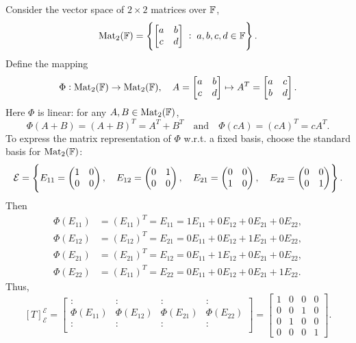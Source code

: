 \documentclass[11pt,openany]{article}
\begin{document}
\newpage
\begin{example*}
	Consider the vector space of \(2 \times 2\) matrices over \(\mathbb{F}\),
	\[
	\operatorname{Mat}_2(\mathbb{F}) = \left\{ \begin{bmatrix} a & b \\ c & d \end{bmatrix} \;:\; a,b,c,d \in \mathbb{F} \right\}.
	\]
	Define the mapping
	\[
	\Phi: \operatorname{Mat}_2(\mathbb{F}) \to \operatorname{Mat}_2(\mathbb{F}), \quad A=\begin{bmatrix} a & b \\ c & d \end{bmatrix} \mapsto A^T=\begin{bmatrix} a & c \\ b & d \end{bmatrix}.
	\] Here $\Phi$ is linear: for any $A,B\in\text{Mat}_2(\mathbb{F})$,
	\[
	\Phi(A+B) = (A+B)^T = A^T+B^T \quad\text{and}\quad \Phi(cA) = (cA)^T = cA^T.
	\]
	To express the matrix representation of \(\Phi\) w.r.t. a fixed basis, choose the standard basis for \(\operatorname{Mat}_2(\mathbb{F})\):
	\[\mathcal{E}=\set{
		E_{11}=\begin{pmatrix}1&0\\0&0\end{pmatrix},\quad
		E_{12}=\begin{pmatrix}0&1\\0&0\end{pmatrix},\quad
		E_{21}=\begin{pmatrix}0&0\\1&0\end{pmatrix},\quad
		E_{22}=\begin{pmatrix}0&0\\0&1\end{pmatrix}}.
	\] Then \begin{align*}
		\Phi(E_{11})&=(E_{11})^T=E_{11}=1E_{11}+0E_{12}+0E_{21}+0E_{22},\\
		\Phi(E_{12})&=(E_{12})^T=E_{21}=0E_{11}+0E_{12}+1E_{21}+0E_{22},\\
		\Phi(E_{21})&=(E_{21})^T=E_{12}=0E_{11}+1E_{12}+0E_{21}+0E_{22},\\
		\Phi(E_{22})&=(E_{11})^T=E_{22}=0E_{11}+0E_{12}+0E_{21}+1E_{22}.
	\end{align*} Thus, \[
	[T]_{\mathcal{E}}^{\mathcal{E}}=\begin{bmatrix}
		: & : & : & : \\
		\Phi(E_{11}) & \Phi(E_{12}) & \Phi(E_{21}) & \Phi(E_{22}) \\
		: & : & : & : \\
	\end{bmatrix}=\begin{bmatrix}
		1 & 0 & 0 & 0 \\
		0 & 0 & 1 & 0 \\
		0 & 1 & 0 & 0 \\
		0 & 0 & 0 & 1
	\end{bmatrix}.
	\]
\end{example*}
\end{document}
